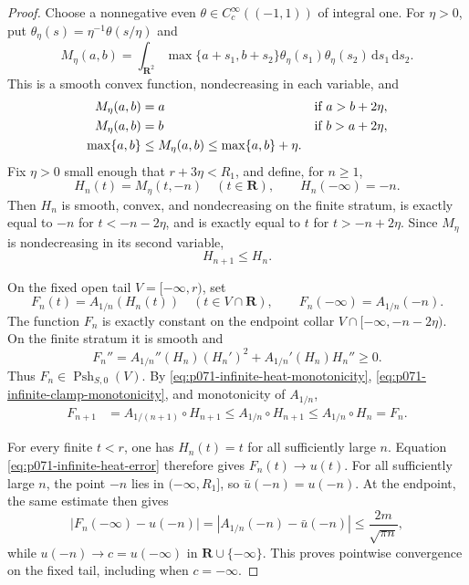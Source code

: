 \begin{proof}
Choose a nonnegative even
\(\theta\in C^\infty_c((-1,1))\) of integral one.  For \(\eta>0\), put
\(\theta_\eta(s)=\eta^{-1}\theta(s/\eta)\) and
\begin{equation}
 M_\eta(a,b)=\int_{\mathbf R^2}
    \max\{a+s_1,b+s_2\}\theta_\eta(s_1)\theta_\eta(s_2)
       \,\mathrm ds_1\,\mathrm ds_2.
 \label{eq:p071-infinite-exact-maximum}
\end{equation}
This is a smooth convex function, nondecreasing in each variable, and
\begin{align}
 M_\eta(a,b)&=a &&\text{if }a>b+2\eta,
 \notag\\
 M_\eta(a,b)&=b &&\text{if }b>a+2\eta,
 \label{eq:p071-infinite-exact-maximum-regions}\\
 \max\{a,b\}&\leq M_\eta(a,b)\leq\max\{a,b\}+\eta.
 \notag
\end{align}
Fix \(\eta>0\) small enough that \(r+3\eta<R_1\), and define, for
\(n\geq1\),
\begin{equation}
 H_n(t)=M_\eta(t,-n)\quad(t\in\mathbf R),
 \qquad H_n(-\infty)=-n.
 \label{eq:p071-infinite-terminal-clamp}
\end{equation}
Then \(H_n\) is smooth, convex, and nondecreasing on the finite stratum,
is exactly equal to \(-n\) for \(t<-n-2\eta\), and is exactly equal to
\(t\) for \(t>-n+2\eta\).  Since \(M_\eta\) is nondecreasing in its
second variable,
\begin{equation}
                         H_{n+1}\leq H_n.
 \label{eq:p071-infinite-clamp-monotonicity}
\end{equation}

On the fixed open tail \(V=[-\infty,r)\), set
\begin{equation}
 F_n(t)=A_{1/n}(H_n(t))\quad(t\in V\cap\mathbf R),
 \qquad
 F_n(-\infty)=A_{1/n}(-n).
 \label{eq:p071-infinite-approximants}
\end{equation}
The function \(F_n\) is exactly constant on the endpoint collar
\(V\cap[-\infty,-n-2\eta)\).  On the finite stratum it is smooth and
\[
 F_n''
  =A_{1/n}''(H_n)(H_n')^2+A_{1/n}'(H_n)H_n''\geq0.
\]
Thus \(F_n\in\operatorname{Psh}_{S,0}(V)\).  By
\eqref{eq:p071-infinite-heat-monotonicity},
\eqref{eq:p071-infinite-clamp-monotonicity}, and monotonicity of
\(A_{1/n}\),
\begin{align}
 F_{n+1}
 &=A_{1/(n+1)}\circ H_{n+1}
 \leq A_{1/n}\circ H_{n+1}
 \leq A_{1/n}\circ H_n=F_n.
 \label{eq:p071-infinite-approximants-decrease}
\end{align}

For every finite \(t<r\), one has \(H_n(t)=t\) for all sufficiently large
\(n\).  Equation \eqref{eq:p071-infinite-heat-error} therefore gives
\(F_n(t)\to u(t)\).  For all sufficiently large \(n\), the point \(-n\)
lies in \((-\infty,R_1]\), so \(\bar u(-n)=u(-n)\).  At the endpoint, the
same estimate then gives
\begin{equation}
 |F_n(-\infty)-u(-n)|
   =|A_{1/n}(-n)-\bar u(-n)|
   \leq\frac{2m}{\sqrt{\pi n}},
 \label{eq:p071-infinite-endpoint-convergence}
\end{equation}
while \(u(-n)\to c=u(-\infty)\) in
\(\mathbf R\cup\{-\infty\}\).  This proves pointwise convergence on
the fixed tail, including when \(c=-\infty\).


\end{proof}
